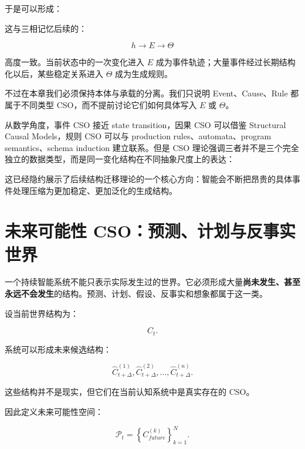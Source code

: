 于是可以形成：

\begin{statementbox}
\centering
{}
\end{statementbox}

这与三相记忆后续的：

\[
h\rightarrow E\rightarrow\Theta
\]

高度一致。当前状态中的一次变化进入 \(E\) 成为事件轨迹；大量事件经过长期结构化以后，某些稳定关系进入 \(\Theta\) 成为生成规则。

不过在本章我们必须保持本体与承载的分离。我们只说明 Event、Cause、Rule 都属于不同类型 CSO，而不提前讨论它们如何具体写入 \(E\) 或 \(\Theta\)。

从数学角度，事件 CSO 接近 state transition，因果 CSO 可以借鉴 Structural Causal Models，规则 CSO 可以与 production rules、automata、program semantics、schema induction 建立联系。但是 CSO 理论强调三者并不是三个完全独立的数据类型，而是同一变化结构在不同抽象尺度上的表达：

\begin{statementbox}
\centering
{}
\end{statementbox}

这已经隐约展示了后续结构迁移理论的一个核心方向：智能会不断把昂贵的具体事件处理压缩为更加稳定、更加泛化的生成结构。


\section{未来可能性 CSO：预测、计划与反事实世界}

一个持续智能系统不能只表示实际发生过的世界。它必须形成大量\textbf{尚未发生、甚至永远不会发生}的结构。预测、计划、假设、反事实和想象都属于这一类。

设当前世界结构为：

\[
C_t.
\]

系统可以形成未来候选结构：

\[
\hat C_{t+\Delta}^{(1)},
\hat C_{t+\Delta}^{(2)},
\ldots,
\hat C_{t+\Delta}^{(n)}.
\]

这些结构并不是现实，但它们在当前认知系统中是真实存在的 CSO。

因此定义未来可能性空间：

\[
\boxed{
\mathcal P_t
=
\left\{
C^{(k)}_{future}
\right\}_{k=1}^{N}.
}
\]

